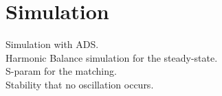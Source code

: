 \chapter{Simulation}
Simulation  with ADS. \\Harmonic Balance simulation for the steady-state.\\ S-param for the matching.\\ Stability that no oscillation occurs.